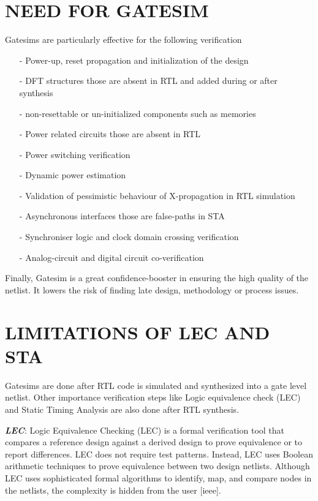 \section {NEED FOR GATESIM}
Gatesims are particularly effective for the following verification
\begin{itemize}
	\item[-]Power-up, reset propagation and initialization of the design
	\item[-]DFT structures those are absent in RTL and added during or after synthesis
	\item[-]non-resettable or un-initialized components such as memories
	\item[-]Power related circuits those are absent in RTL
	\item[-]Power switching verification
	\item[-]Dynamic power estimation
	\item[-]Validation of pessimistic behaviour of X-propagation in RTL simulation
	\item[-]Asynchronous interfaces those are false-paths in STA
	\item[-]Synchroniser logic and clock domain crossing verification
	\item[-]Analog-circuit and digital circuit co-verification
\end{itemize}

Finally, Gatesim is a great confidence-booster in ensuring the high quality of the netlist. It lowers the risk of finding late design, methodology or process issues.




\section{LIMITATIONS OF LEC AND STA}

Gatesims are done after RTL code is simulated and synthesized into a gate level netlist. Other importance verification steps like Logic equivalence check (LEC) and Static Timing Analysis are also done after RTL synthesis. 

\emph {\bf LEC}: Logic Equivalence Checking (LEC) is a formal verification tool that compares a reference design against a derived design to prove equivalence or to report differences.  LEC does not require test patterns. Instead, LEC uses Boolean arithmetic techniques to prove equivalence between two design netlists. Although LEC uses sophisticated formal algorithms to identify, map, and compare nodes in the netlists, the complexity is hidden from the user [ieee].

